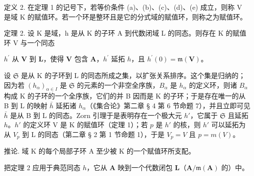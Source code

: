 定义 2. 在定理 1 的记号下，若等价条件 (a)、(b)、(c)、(d)、(e) 成立，则称 V 是域 K 的赋值环。若一个环是整环且是它的分式域的赋值环，则称之为赋值环。

定理 2. 设 K 是域，h 是从 K 的子环 A 到代数闭域 L 的同态。则存在 K 的赋值环 V 与一个同态

\(h^{\prime}\) 从 \(\mathbf{V}\) 到 \(\mathbf{L}\)，使得 \(\mathbf{V}\) 包含 \(\mathbf{A}\)，\(h^{\prime}\) 延拓 \(h\)，且 \(h^{\prime}(0) = \mathfrak{m}(\mathbf{V})\)。

设 \(\mathfrak{S}\) 是从 K 的子环到 L 的同态所成之集，以扩张关系排序。这个集是归纳的；因为若 \((h_{\alpha})_{\alpha \in I}\) 是 \(\mathfrak{S}\) 的元素的一个非空全序族，\(B_{\alpha}\) 是 \(h_{\alpha}\) 的定义环，则诸 \(B_{\alpha}\) 构成 K 的子环的一个全序族，它们的并 B 因而是 K 的子环；于是存在唯一的从 B 到 L 的映射 \(\bar{h}\) 延拓诸 \(h_{\alpha}\)（《集合论》第二章 § 4 第 6 节命题 7），并且立即可见 \(\bar{h}\) 是从 B 到 L 的同态。Zorn 引理于是表明存在一个极大元 \(h'\)，它属于 \(\mathfrak{S}\) 且延拓 \(h\)。\(h'\) 的定义环 V 是 K 的赋值环（定理 1）；若 \(p\) 是 \(h'\) 的核，则 \(h'\) 可以延拓为从 \(V_p\) 到 L 的同态（第二章 § 2 第 1 节命题 1），于是 \(V_p = V\) 且 \(p = m(V)\)。

推论. 域 K 的每个局部子环 A 至少被 K 的一个赋值环所支配。

把定理 2 应用于典范同态 \(h\)，它从 \(\mathbf{A}\) 映到一个代数闭包 \(\mathbf{L}\)（\(\mathbf{A} / \mathfrak{m}(\mathbf{A})\) 的）中。

